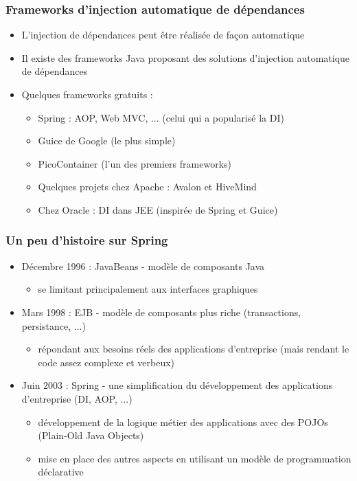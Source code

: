\documentclass{beamer}
\begin{document}
\begin{frame}[fragile]
  \frametitle{Frameworks d'injection automatique de dépendances}
  \begin{itemize}
  \item L'injection de dépendances peut être réalisée de façon
    automatique
  \item Il existe des frameworks Java proposant des solutions
    d'injection automatique de dépendances
  \item Quelques frameworks gratuits :
    \begin{itemize}
    \item Spring : AOP, Web MVC, ... (celui qui a popularisé la DI)
    \item Guice de Google (le plus simple)
    \item PicoContainer (l'un des premiers frameworks)
    \item Quelques projets chez Apache : Avalon et HiveMind
    \item Chez Oracle : DI dans JEE (inspirée de Spring et Guice)
    \end{itemize}
  \end{itemize}
\end{frame}

\begin{frame}[fragile]
  \frametitle{Un peu d'histoire sur Spring}
  \begin{itemize}
  \item Décembre 1996 : JavaBeans - modèle de composants Java
    \begin{itemize}
    \item se limitant principalement aux interfaces graphiques
    \end{itemize}        
  \item Mars 1998 : EJB - modèle de composants plus riche
    (transactions, persistance, ...)
    \begin{itemize}
    \item répondant aux besoins réels des applications d'entreprise
      (mais rendant le code assez complexe et verbeux)
    \end{itemize}      
  \item Juin 2003 : Spring - une simplification du développement des
    applications d'entreprise (DI, AOP, ...)
    \begin{itemize}
    \item développement de la logique métier des applications avec des
      POJOs (Plain-Old Java Objects)
    \item mise en place des autres aspects en utilisant un modèle de
      programmation déclarative
    \end{itemize}
  \end{itemize}
\end{frame}
\end{document}
